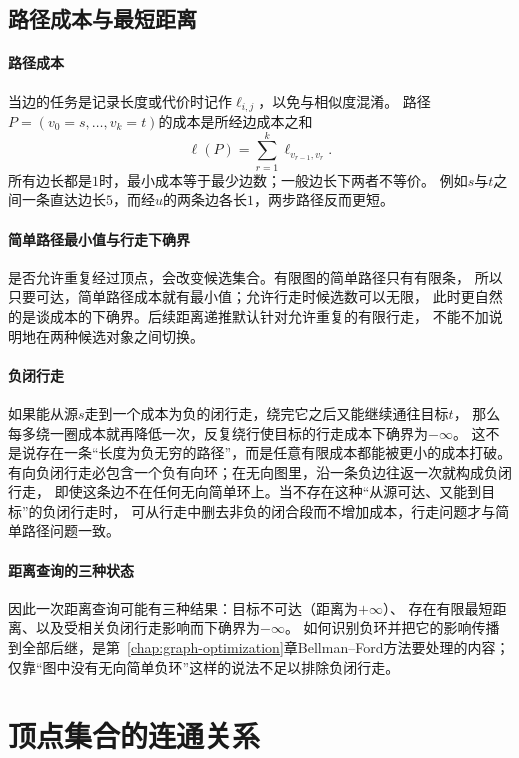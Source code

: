 \subsection{路径成本与最短距离}

\paragraph{路径成本}
当边的任务是记录长度或代价时记作$\ell_{i,j}$，以免与相似度混淆。
路径$P=(v_0=s,\ldots,v_k=t)$的成本是所经边成本之和
\[
  \ell(P)=\sum_{r=1}^k\ell_{v_{r-1},v_r}.
\]
所有边长都是$1$时，最小成本等于最少边数；一般边长下两者不等价。
例如$s$与$t$之间一条直达边长$5$，而经$u$的两条边各长$1$，两步路径反而更短。

\paragraph{简单路径最小值与行走下确界}
是否允许重复经过顶点，会改变候选集合。有限图的简单路径只有有限条，
所以只要可达，简单路径成本就有最小值；允许行走时候选数可以无限，
此时更自然的是谈成本的下确界。后续距离递推默认针对允许重复的有限行走，
不能不加说明地在两种候选对象之间切换。

\paragraph{负闭行走}
如果能从源$s$走到一个成本为负的闭行走，绕完它之后又能继续通往目标$t$，
那么每多绕一圈成本就再降低一次，反复绕行使目标的行走成本下确界为$-\infty$。
这不是说存在一条“长度为负无穷的路径”，而是任意有限成本都能被更小的成本打破。
有向负闭行走必包含一个负有向环；在无向图里，沿一条负边往返一次就构成负闭行走，
即使这条边不在任何无向简单环上。当不存在这种“从源可达、又能到目标”的负闭行走时，
可从行走中删去非负的闭合段而不增加成本，行走问题才与简单路径问题一致。

\paragraph{距离查询的三种状态}
因此一次距离查询可能有三种结果：目标不可达（距离为$+\infty$）、
存在有限最短距离、以及受相关负闭行走影响而下确界为$-\infty$。
如何识别负环并把它的影响传播到全部后继，是第~\ref{chap:graph-optimization}章Bellman--Ford方法要处理的内容；
仅靠“图中没有无向简单负环”这样的说法不足以排除负闭行走。

\section{顶点集合的连通关系}

